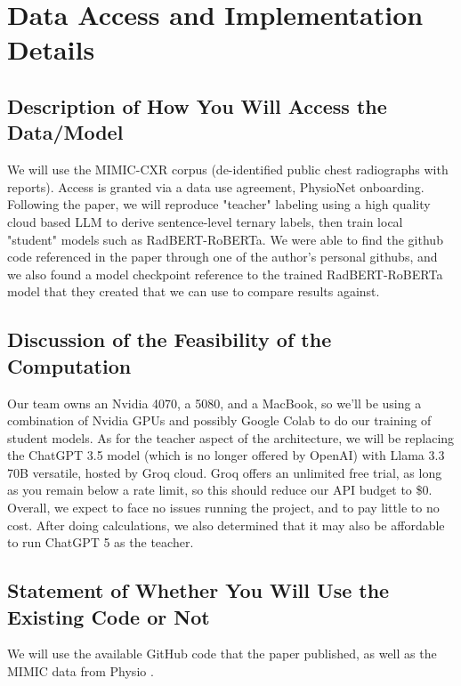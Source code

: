\documentclass[letterpaper]{article} %
\begin{document}
\section{Data Access and Implementation Details}

\subsection{Description of How You Will Access the Data/Model}
We will use the MIMIC-CXR corpus (de-identified public chest radiographs with reports). Access is granted via a data use agreement, PhysioNet onboarding. Following the paper, we will reproduce "teacher" labeling using a high quality cloud based LLM to derive sentence-level ternary labels, then train local "student" models such as RadBERT-RoBERTa. We were able to find the github code referenced in the paper through one of the author's personal githubs, and we also found a model checkpoint reference to the trained RadBERT-RoBERTa model that they created that we can use to compare results against.

\subsection{Discussion of the Feasibility of the Computation}
Our team owns an Nvidia 4070, a 5080, and a MacBook, so we'll be using a combination of Nvidia GPUs and possibly Google Colab to do our training of student models.  As for the teacher aspect of the architecture, we will be replacing the ChatGPT 3.5 model (which is no longer offered by OpenAI) with Llama 3.3 70B versatile, hosted by Groq cloud.  Groq offers an unlimited free trial, as long as you remain below a rate limit, so this should reduce our API budget to \$0.  Overall, we expect to face no issues running the project, and to pay little to no cost.  After doing calculations, we also determined that it may also be affordable to run ChatGPT 5 as the teacher.

\subsection{Statement of Whether You Will Use the Existing Code or Not}
We will use the available GitHub code that the paper published, as well as the MIMIC data from Physio \cite{mimiccxr}.
\end{document}
